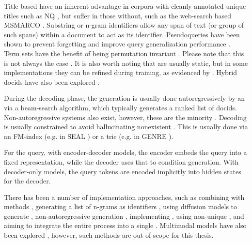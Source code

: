 Title-based  have an inherent advantage in corpora with cleanly annotated unique titles such as NQ \cite{kwiatkowski-natural-questions}, but suffer in those without, such as the web-search based MSMARCO \cite{payal-bajaj-ms-marco}. Substring or n-gram identifiers allow any span of text (or group of such spans) within a document to act as its identifier. Pseudoqueries have been shown to prevent forgetting \cite{chen-continual-learning} and improve query generalization performance \cite{ronak-pradeep-how-does}.
Term sets have the benefit of being permutation invariant \cite{peitian-zhang-generative-retrieval}. Please note that this is not always the case \cite{hansi-zeng-planning-ahead}. It is also worth noting that  are usually static, but in some implementations they can be refined during training, as evidenced by \citet{sunkyung-lee-glen-generative,weiwei-sun-learning-to}. Hybrid docids have also been explored \cite{thong-nguyen-generative-retrieval}.



During the decoding phase, the generation is usually done autoregressively by an  via a beam-search algorithm, which typically
generates a ranked list of docids. Non-autoregressive systems also exist, however, these are the minority \cite{ravisri-valluri-scaling-the,xinpeng-zhao-diffugr-generative}.
Decoding is usually constrained to avoid hallucinating nonexistent . This is usually done via an FM-index \cite{ferragina-opportunistic-data} (e.g. in SEAL \cite{michele-bevilacqua-autoregressive-search}) or a trie (e.g. in GENRE \cite{nicola-de-cao-autoregressive-entity}).

For the query, with encoder-decoder models, the encoder embeds the query into a fixed representation, while the decoder uses that to condition  generation. With decoder-only models, the query tokens are encoded implicitly into hidden states for the decoder.

There has been a number of  implementation approaches, such as combining  with  methods \cite{peiwen-yuan-generative-dense}, generating a list of n-grams as identifiers \cite{michele-bevilacqua-autoregressive-search,yongqi-li-multiview-identifiers}, using diffusion models to generate  \cite{xinpeng-zhao-diffugr-generative,qiao-diffusionret-diffusionenhanced}, 
non-autoregressive generation \cite{ravisri-valluri-scaling-the,xinpeng-zhao-diffugr-generative}, implementing  \cite{zhou-yujia-enhancing-generative}, using non-unique  \cite{tianchi-yang-auto-search}, and aiming to integrate the entire  process into a single  \cite{qiaoyu-tang-selfretrieval-endtoend}. Multimodal  models have also been explored \cite{zhang-irgen}, however, such methods are out-of-scope for this thesis.

